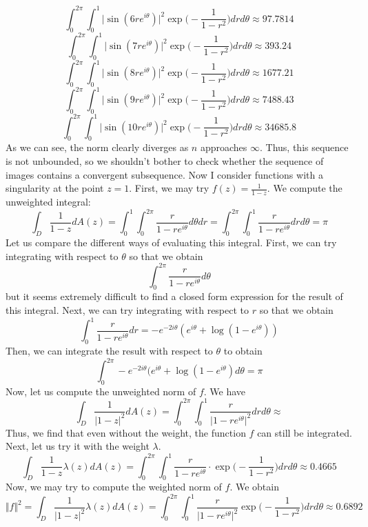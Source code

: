 \documentclass[12pt]{article}
\begin{document}
\[
\int_0^{2\pi} \int_0^1 \vert \sin(6re^{i\theta}) \vert^2 \exp\bigg(-\frac{1}{1-r^2}\bigg) dr d\theta \approx 97.7814
\]
\[
\int_0^{2\pi} \int_0^1 \vert \sin(7re^{i\theta}) \vert^2 \exp\bigg(-\frac{1}{1-r^2}\bigg) dr d\theta \approx 393.24
\]
\[
\int_0^{2\pi} \int_0^1 \vert \sin(8re^{i\theta}) \vert^2 \exp\bigg(-\frac{1}{1-r^2}\bigg) dr d\theta \approx 1677.21
\]
\[
\int_0^{2\pi} \int_0^1 \vert \sin(9re^{i\theta}) \vert^2 \exp\bigg(-\frac{1}{1-r^2}\bigg) dr d\theta \approx 7488.43
\]
\[
\int_0^{2\pi} \int_0^1 \vert \sin(10re^{i\theta}) \vert^2 \exp\bigg(-\frac{1}{1-r^2}\bigg) dr d\theta \approx 34685.8
\] As we can see, the norm clearly diverges as $n$ approaches $\infty$. Thus, this sequence is not unbounded, so we shouldn't bother to check whether the sequence of images contains a convergent subsequence. Now I consider functions with a singularity at the point $z = 1$. First, we may try $f(z) = \frac{1}{1-z}$. We compute the unweighted integral:
\[
\int_D \frac{1}{1-z} dA(z) = \int_0^1 \int_0^{2\pi} \frac{r}{1-re^{i\theta}} d\theta dr = \int_0^{2\pi} \int_0^1 \frac{r}{1-re^{i\theta}} dr d\theta = \pi
\] Let us compare the different ways of evaluating this integral. First, we can try integrating with respect to $\theta$ so that we obtain
\[
\int_0^{2\pi} \frac{r}{1-re^{i\theta}} d\theta
\] but it seems extremely difficult to find a closed form expression for the result of this integral. Next, we can try integrating with respect to $r$ so that we obtain
\[
\int_0^1 \frac{r}{1-re^{i\theta}} dr = -e^{-2i \theta}(e^{i\theta} + \log(1 - e^{i\theta}))
\] Then, we can integrate the result with respect to $\theta$ to obtain
\[
\int_0^{2\pi} -e^{-2i \theta}(e^{i\theta} + \log(1 - e^{i\theta}) d \theta = \pi
\] Now, let us compute the unweighted norm of $f$. We have
\[
\int_D \frac{1}{\vert 1- z \vert^2} dA(z) = \int_0^{2\pi} \int_0^1 \frac{r}{\vert 1 - re^{i\theta} \vert^2} dr d \theta \approx 
\]
Thus, we find that even without the weight, the function $f$ can still be integrated. Next, let us try it with the weight $\lambda$.
\[
\int_D \frac{1}{1-z} \lambda(z) dA(z) = \int_0^{2\pi} \int_0^1 \frac{r}{1-re^{i\theta}}\cdot \exp\bigg(-\frac{1}{1-r^2}\bigg) dr d\theta \approx 0.4665
\] Now, we may try to compute the weighted norm of $f$. We obtain
\[
\Vert f \Vert ^2 = \int_D \frac{1}{\vert 1-z \vert^2} \lambda(z) dA(z) = \int_0^{2\pi} \int_0^1 \frac{r}{\vert 1 - re^{i\theta} \vert^2} \exp\bigg(-\frac{1}{1-r^2}\bigg) dr d\theta \approx 0.6892
\]
\end{document}
